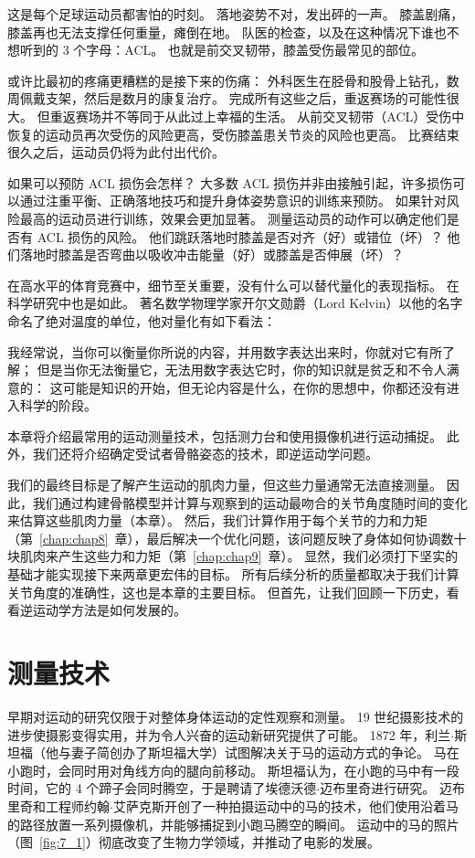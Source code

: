 这是每个足球运动员都害怕的时刻。
落地姿势不对，发出砰的一声。
膝盖剧痛，膝盖再也无法支撑任何重量，瘫倒在地。
队医的检查，以及在这种情况下谁也不想听到的 3 个字母：ACL。
也就是前交叉韧带，膝盖受伤最常见的部位。


或许比最初的疼痛更糟糕的是接下来的伤痛：
外科医生在胫骨和股骨上钻孔，数周佩戴支架，然后是数月的康复治疗。
完成所有这些之后，重返赛场的可能性很大。
但重返赛场并不等同于从此过上幸福的生活。
从前交叉韧带（ACL）受伤中恢复的运动员再次受伤的风险更高，受伤膝盖患关节炎的风险也更高。
比赛结束很久之后，运动员仍将为此付出代价。


如果可以预防 ACL 损伤会怎样？
大多数 ACL 损伤并非由接触引起，许多损伤可以通过注重平衡、正确落地技巧和提升身体姿势意识的训练来预防。
如果针对风险最高的运动员进行训练，效果会更加显著。
测量运动员的动作可以确定他们是否有 ACL 损伤的风险。
他们跳跃落地时膝盖是否对齐（好）或错位（坏）？
他们落地时膝盖是否弯曲以吸收冲击能量（好）或膝盖是否伸展（坏）？


在高水平的体育竞赛中，细节至关重要，没有什么可以替代量化的表现指标。
在科学研究中也是如此。
著名数学物理学家开尔文勋爵（Lord Kelvin）以他的名字命名了绝对温度的单位，他对量化有如下看法\cite{thomson1894popular}：



我经常说，当你可以衡量你所说的内容，并用数字表达出来时，你就对它有所了解；
但是当你无法衡量它，无法用数字表达它时，你的知识就是贫乏和不令人满意的：
这可能是知识的开始，但无论内容是什么，在你的思想中，你都还没有进入科学的阶段。


本章将介绍最常用的运动测量技术，包括测力台和使用摄像机进行运动捕捉。
此外，我们还将介绍确定受试者骨骼姿态的技术，即逆运动学问题。


我们的最终目标是了解产生运动的肌肉力量，但这些力量通常无法直接测量。
因此，我们通过构建骨骼模型并计算与观察到的运动最吻合的关节角度随时间的变化来估算这些肌肉力量（本章）。
然后，我们计算作用于每个关节的力和力矩（第~\ref{chap:chap8}~章），最后解决一个优化问题，该问题反映了身体如何协调数十块肌肉来产生这些力和力矩（第~\ref{chap:chap9}~章）。
显然，我们必须打下坚实的基础才能实现接下来两章更宏伟的目标。
所有后续分析的质量都取决于我们计算关节角度的准确性，这也是本章的主要目标。
但首先，让我们回顾一下历史，看看逆运动学方法是如何发展的。



\section{测量技术}

早期对运动的研究仅限于对整体身体运动的定性观察和测量。
19 世纪摄影技术的进步使摄影变得实用，并为令人兴奋的运动新研究提供了可能。
1872 年，利兰$\cdot$斯坦福（他与妻子简创办了斯坦福大学）试图解决关于马的运动方式的争论。
马在小跑时，会同时用对角线方向的腿向前移动。
斯坦福认为，在小跑的马中有一段时间，它的 4 个蹄子会同时腾空，于是聘请了埃德沃德$\cdot$迈布里奇进行研究。
迈布里奇和工程师约翰$\cdot$艾萨克斯开创了一种拍摄运动中的马的技术，他们使用沿着马的路径放置一系列摄像机，并能够捕捉到小跑马腾空的瞬间。
运动中的马的照片（图~\ref{fig:7_1}）彻底改变了生物力学领域，并推动了电影的发展。


